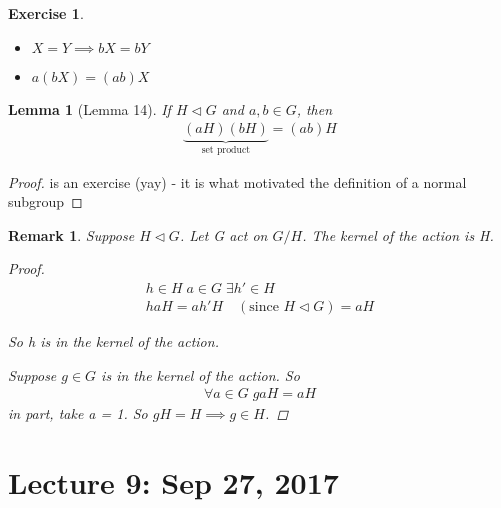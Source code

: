 \documentclass[11pt, oneside]{book}
\theoremstyle{break}
\newtheorem*{proof}{Proof}
\newtheorem{lemma}{Lemma}[section]
\newtheorem*{remark}{Remark}
\newtheorem{ex}{Exercise}[section]
\begin{document}
\begin{ex}
    \begin{itemize}
        \item $X = Y \implies bX = bY$
        \item $a(bX) = (ab)X$
    \end{itemize}
\end{ex}

\begin{lemma}[Lemma 14]\label{lemma:14}
    If $H \triangleleft G$ and $a, b \in G$, then
    \begin{align}
        \underbrace{(aH)(bH)}_{\text{set product}} = (ab)H
    \end{align}
\end{lemma}

\begin{proof}
    is an exercise (yay) - it is what motivated the definition of a normal subgroup
\end{proof}

\begin{remark}
    Suppose $H \triangleleft G$. Let G act on $G/H$. The kernel of the action is H.

    \begin{proof}
        \begin{gather*}
            h \in H \; a \in G \; \exists h' \in H \\
            haH = ah'H \quad (\text{since $H \triangleleft G$}) = aH
        \end{gather*}

        So h is in the kernel of the action.

        Suppose $g \in G$ is in the kernel of the action. So
        \begin{gather*}
            \forall a \in G \; gaH = aH
        \end{gather*}
        in part, take a = 1. So $gH = H \implies g \in H$.
    \end{proof}
\end{remark}

\chapter{Lecture 9: Sep 27, 2017}\label{chp:lec9}
\end{document}
